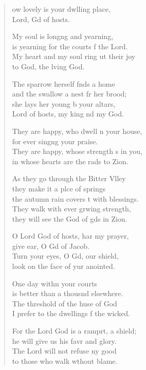 \begin{verse}
  \begin{patverse}
ow lovely is your dwlling place,\Med\\
Lord, Gd of hosts.

My soul is long\pointup{\i}ng and yearning,\Med\\
is yearning for the courts f the Lord.\\
My heart and my soul ring ut their joy\Med\\
to God, the l\pointup{\i}ving God.

The sparrow herself f\pointup{\i}nds a home\Med\\
and the swallow a nest fr her brood;\\
she lays her young b your altars,\Med\\
Lord of hosts, my king nd my God.

They are happy, who dwell \pointup{\i}n your house,\Med\\
for ever sing\pointup{\i}ng your praise.\\
They are happy, whose strength \pointup{\i}s in you,\Med\\
in whose hearts are the rads to Zion.

As they go through the Bitter Vlley\Flex\\
they make it a plce of springs\Med\\
the autumn rain covers \pointup{\i}t with blessings.\\
They walk with ever grwing strength,\Med\\
they will see the God of gds in Zion.

O Lord God of hosts, har my prayer,\Med\\
give ear, O Gd of Jacob.\\
Turn your eyes, O Gd, our shield,\Med\\
look on the face of yur anointed.

One day with\pointup{\i}n your courts\Med\\
is better than a thousnd elsewhere.\\
The threshold of the huse of God\Med\\
I prefer to the dwellings f the wicked.

For the Lord God is a ramprt, a shield;\Med\\
he will give us his favr and glory.\\
The Lord will not refuse ny good\Med\\
to those who walk w\pointup{\i}thout blame.


\end{patverse}
\end{verse}
